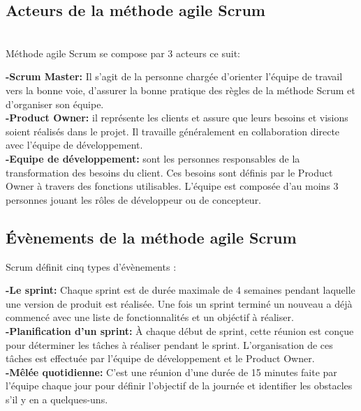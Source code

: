 \subsection{\selectfont\Large    Acteurs de la méthode agile Scrum}
\texttt{}\\[0.2cm]

Méthode agile Scrum se compose par 3  acteurs ce suit:
\par \noindent \textbf{\Large -Scrum Master: } Il s'agit de la personne chargée d'orienter l'équipe de travail vers la bonne voie, d'assurer la bonne pratique des règles de la méthode Scrum et d'organiser son équipe. \\[0.1cm]

\noindent \textbf{\Large -Product Owner: } il représente les clients et assure que leurs besoins et visions soient réalisés dans le projet. Il travaille généralement en collaboration directe avec l’équipe de développement. \\[0.1cm]

\noindent \textbf{\Large -Equipe de développement: }sont les personnes responsables de la transformation des besoins du client. Ces besoins sont définis par le Product Owner à travers des fonctions utilisables. L'équipe est composée d'au moins 3 personnes jouant les rôles de développeur ou de concepteur.\\[0.1cm]
\subsection{\selectfont\Large Évènements de la méthode agile Scrum }

 Scrum définit cinq types d'évènements :\\[0.1cm]%
\par \noindent \textbf{\Large -Le sprint: }Chaque sprint est de durée maximale de 4 semaines pendant laquelle une version de produit est réalisée. Une fois un sprint terminé un nouveau a déjà commencé avec une liste de fonctionnalités et un objéctif à réaliser. \\[0.1cm]

\noindent \textbf{\Large -Planification d’un sprint: }À chaque début de sprint, cette réunion est conçue pour déterminer les tâches à réaliser pendant le sprint. L’organisation de ces tâches est effectuée par l’équipe de développement et le Product Owner. \\[0.1cm]

\noindent \textbf{\Large -Mêlée quotidienne: } C'est une réunion d'une durée de 15 minutes faite par l’équipe chaque jour pour définir l’objectif de la journée et identifier les obstacles s’il y en a quelques-uns.\\[0.1cm]

